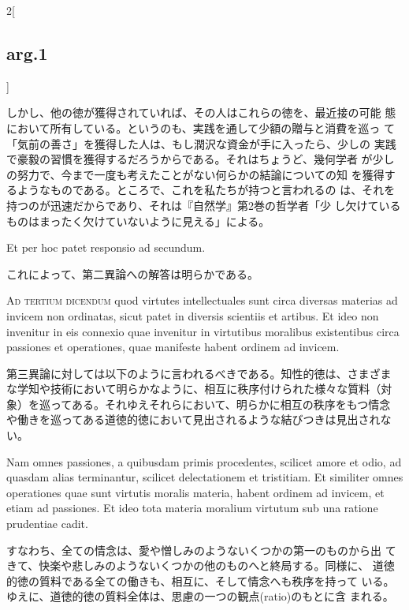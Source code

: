 \documentclass[paper=a4paper,fontsize=10pt,jafontsize=9pt,titlepage]{jlreq}
\begin{document}
\begin{paracol}{2}[\subsection{arg.1}]
\switchcolumn

しかし、他の徳が獲得されていれば、その人はこれらの徳を、最近接の可能
 態において所有している。というのも、実践を通して少額の贈与と消費を巡っ
 て「気前の善さ」を獲得した人は、もし潤沢な資金が手に入ったら、少しの
 実践で豪毅の習慣を獲得するだろうからである。それはちょうど、幾何学者
 が少しの努力で、今まで一度も考えたことがない何らかの結論についての知
 を獲得するようなものである。ところで、これを私たちが持つと言われるの
 は、それを持つのが迅速だからであり、それは『自然学』第2巻の哲学者「少
 し欠けているものはまったく欠けていないように見える」による。

\switchcolumn*[\subsection{ad.2}]

Et per hoc patet responsio ad secundum.

\switchcolumn

これによって、第二異論への解答は明らかである。

\switchcolumn*[\subsection{ad.3}]

{\scshape Ad tertium dicendum} quod virtutes intellectuales sunt circa
diversas materias ad invicem non ordinatas, sicut patet in diversis
scientiis et artibus. Et ideo non invenitur in eis connexio quae
invenitur in virtutibus moralibus existentibus circa passiones et
 operationes, quae manifeste habent ordinem ad invicem.

\switchcolumn

第三異論に対しては以下のように言われるべきである。知性的徳は、さまざま
な学知や技術において明らかなように、相互に秩序付けられた様々な質料（対
象）を巡ってある。それゆえそれらにおいて、明らかに相互の秩序をもつ情念
や働きを巡ってある道徳的徳において見出されるような結びつきは見出されな
い。

\switchcolumn*

Nam omnes passiones, a quibusdam primis procedentes, scilicet amore
et odio, ad quasdam alias terminantur, scilicet delectationem et
tristitiam. Et similiter omnes operationes quae sunt virtutis moralis
materia, habent ordinem ad invicem, et etiam ad passiones. Et ideo
tota materia moralium virtutum sub una ratione prudentiae cadit.

\switchcolumn

すなわち、全ての情念は、愛や憎しみのようないくつかの第一のものから出
 てきて、快楽や悲しみのようないくつかの他のものへと終局する。同様に、
 道徳的徳の質料である全ての働きも、相互に、そして情念へも秩序を持って
 いる。ゆえに、道徳的徳の質料全体は、思慮の一つの観点(ratio)のもとに含
 まれる。


\end{paracol}
\end{document}
